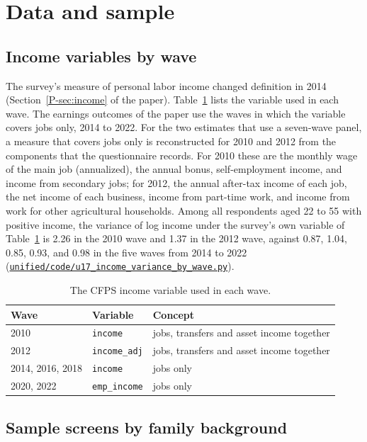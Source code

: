\documentclass[11pt]{article}
\numberwithin{equation}{section}
\newcommand{\repourl}{https://github.com/JiachenJin1001/family-background-earnings-china}
\newcommand{\code}[1]{\href{\repourl/blob/main/#1}{\nolinkurl{#1}}}
\begin{document}
\section{Data and sample}
\label{oa:data}

\subsection{Income variables by wave}

The survey's measure of personal labor income changed definition in 2014
(Section~\ref{P-sec:income} of the paper). Table~\ref{oatab:income}
lists the variable used in each wave. The earnings outcomes of the
paper use the waves in which the variable covers jobs only, 2014 to
2022. For the two estimates that use a seven-wave
panel, a measure that covers jobs only is reconstructed for 2010 and
2012 from the components that the questionnaire records. For 2010 these
are the monthly wage of the main job (annualized), the annual bonus,
self-employment income, and income from secondary jobs; for 2012, the
annual after-tax income of each job, the net income of each business,
income from part-time work, and income from work for other agricultural
households. Among all respondents aged 22 to 55 with positive income, the variance of log income under the survey's own variable of Table~\ref{oatab:income} is 2.26 in the 2010 wave and 1.37 in the 2012 wave, against 0.87, 1.04, 0.85, 0.93, and 0.98 in the five waves from 2014 to 2022 (\code{unified/code/u17_income_variance_by_wave.py}).

\begin{table}[H]
\centering
\small
\caption{The CFPS income variable used in each wave.}
\label{oatab:income}
\begin{tabular}{@{}lll@{}}
\toprule
Wave & Variable & Concept \\
\midrule
2010 & \texttt{income} & jobs, transfers and asset income together \\
2012 & \texttt{income\_adj} & jobs, transfers and asset income together \\
2014, 2016, 2018 & \texttt{income} & jobs only \\
2020, 2022 & \texttt{emp\_income} & jobs only \\
\bottomrule
\end{tabular}
\end{table}

\subsection{Sample screens by family background}
\end{document}
